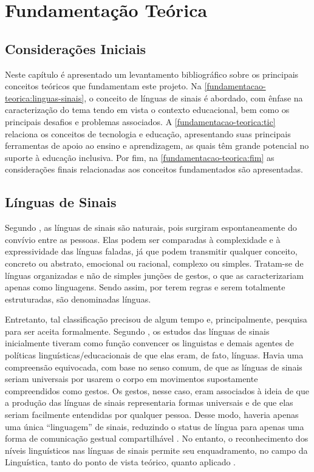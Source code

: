 \chapter{Fundamentação Teórica}
\label{chapter:fundamentacao-teorica}

\section{Considerações Iniciais}
\label{fundamentacao-teorica:inicio}

Neste capítulo é apresentado um levantamento bibliográfico sobre os principais conceitos teóricos que fundamentam este projeto. Na \autoref{fundamentacao-teorica:linguas-sinais}, o conceito de línguas de sinais é abordado, com ênfase na caracterização do tema tendo em vista o contexto educacional, bem como os principais desafios e problemas associados. A \autoref{fundamentacao-teorica:tic} relaciona os conceitos de tecnologia e educação, apresentando suas principais ferramentas de apoio ao ensino e aprendizagem, as quais têm grande potencial no suporte à educação inclusiva. Por fim, na \autoref{fundamentacao-teorica:fim} as considerações finais relacionadas aos conceitos fundamentados são apresentadas.

\section{Línguas de Sinais}
\label{fundamentacao-teorica:linguas-sinais}

Segundo , as línguas de sinais são naturais, pois surgiram espontaneamente do convívio entre as pessoas. Elas podem ser comparadas à complexidade e à expressividade das línguas faladas, já que podem transmitir qualquer conceito, concreto ou abstrato, emocional ou racional, complexo ou simples. Tratam-se de línguas organizadas e não de simples junções de gestos, o que as caracterizariam apenas como linguagens. Sendo assim, por terem regras e serem totalmente estruturadas, são denominadas línguas.

Entretanto, tal classificação precisou de algum tempo e, principalmente, pesquisa para ser aceita formalmente. Segundo , os estudos das línguas de sinais inicialmente tiveram como função convencer os linguistas e demais agentes de políticas linguísticas/educacionais de que elas eram, de fato, línguas. Havia uma compreensão equivocada, com base no senso comum, de que as línguas de sinais seriam universais por usarem o corpo em movimentos supostamente compreendidos como gestos. Os gestos, nesse caso, eram associados à ideia de que a produção das línguas de sinais representaria formas universais e de que elas seriam facilmente entendidas por qualquer pessoa. Desse modo, haveria apenas uma única ``linguagem'' de sinais, reduzindo o status de língua para apenas uma forma de comunicação gestual compartilhável \cite{Quadros2004}. No entanto, o reconhecimento dos níveis linguísticos nas línguas de sinais permite seu enquadramento, no campo da Linguística, tanto do ponto de vista teórico, quanto aplicado \cite{Quadros2019}.

